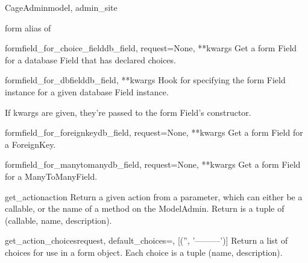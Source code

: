 \documentclass[letterpaper,10pt,english]{sphinxmanual}
\begin{document}
\begin{classdesc}{CageAdmin}{model, admin\_site}
\hypertarget{animal.admin.CageAdmin.form}{}\begin{memberdesc}{form}
alias of 
\end{memberdesc}

\hypertarget{animal.admin.CageAdmin.formfield_for_choice_field}{}\begin{methoddesc}{formfield\_for\_choice\_field}{db\_field, request=None, **kwargs}
Get a form Field for a database Field that has declared choices.
\end{methoddesc}

\hypertarget{animal.admin.CageAdmin.formfield_for_dbfield}{}\begin{methoddesc}{formfield\_for\_dbfield}{db\_field, **kwargs}
Hook for specifying the form Field instance for a given database Field
instance.

If kwargs are given, they're passed to the form Field's constructor.
\end{methoddesc}

\hypertarget{animal.admin.CageAdmin.formfield_for_foreignkey}{}\begin{methoddesc}{formfield\_for\_foreignkey}{db\_field, request=None, **kwargs}
Get a form Field for a ForeignKey.
\end{methoddesc}

\hypertarget{animal.admin.CageAdmin.formfield_for_manytomany}{}\begin{methoddesc}{formfield\_for\_manytomany}{db\_field, request=None, **kwargs}
Get a form Field for a ManyToManyField.
\end{methoddesc}

\hypertarget{animal.admin.CageAdmin.get_action}{}\begin{methoddesc}{get\_action}{action}
Return a given action from a parameter, which can either be a callable,
or the name of a method on the ModelAdmin.  Return is a tuple of
(callable, name, description).
\end{methoddesc}

\hypertarget{animal.admin.CageAdmin.get_action_choices}{}\begin{methoddesc}{get\_action\_choices}{request, default\_choices=, {[}('', '---------'){]}}
Return a list of choices for use in a form object.  Each choice is a
tuple (name, description).
\end{methoddesc}


\end{classdesc}
\end{document}
